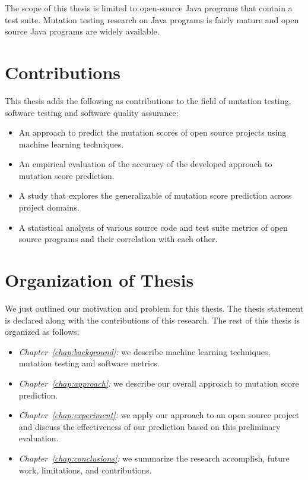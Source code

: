 The scope of this thesis is limited to open-source Java programs that contain a test suite. Mutation testing research on Java programs is fairly mature and open source Java programs are widely available.


\section{Contributions}
\label{sec:introduction_contributions}
This thesis adds the following as contributions to the field of mutation testing, software testing and software quality assurance:

\begin{itemize}
  \item An approach to predict the mutation scores of open source projects using machine learning techniques.
  \item An empirical evaluation of the accuracy of the developed approach to mutation score prediction.
  \item A study that explores the generalizable of mutation score prediction across project domains.
  \item A statistical analysis of various source code and test suite metrics of open source programs and their correlation with each other.
\end{itemize}


\section{Organization of Thesis}
\label{sec:introduction_organization}
We just outlined our motivation and problem for this thesis. The thesis statement is declared along with the contributions of this research. The rest of this thesis is organized as follows:

\begin{itemize}
  \item \emph{Chapter~\ref{chap:background}:} we describe machine learning techniques,  mutation testing and software metrics.
  \item \emph{Chapter~\ref{chap:approach}:} we describe our overall approach to mutation score prediction.
  \item \emph{Chapter~\ref{chap:experiment}:} we apply our approach to an open source project and discuss the effectiveness of our prediction based on this preliminary evaluation.
  \item \emph{Chapter~\ref{chap:conclusions}:} we summarize the research accomplish, future work, limitations, and contributions.
\end{itemize}
